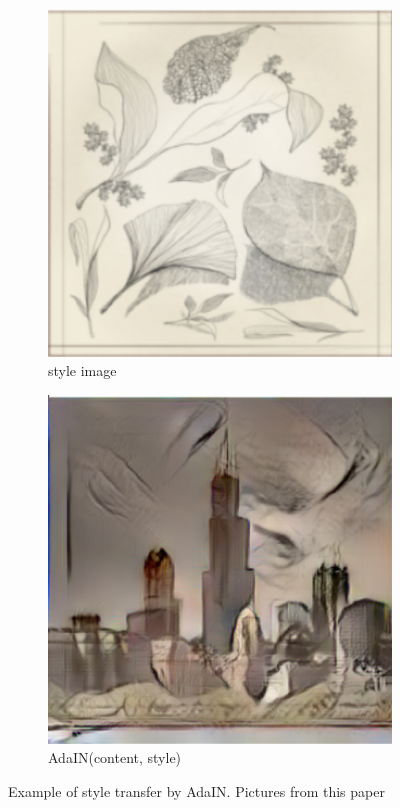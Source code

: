 \documentclass[a4paper]{article}
\begin{document}
\begin{figure}[H]
\begin{subfigure}{.45\textwidth}
    \includegraphics[width=\linewidth]{imagesfrompapers/style image.png}
    \caption{style image}
  \end{subfigure}
  \begin{subfigure}{.45\textwidth}
    \centering
    \includegraphics[width=\linewidth]{imagesfrompapers/AdaIN.png}
    \caption{AdaIN(content, style)}
  \end{subfigure}
  \caption{Example of style transfer by AdaIN. Pictures from this paper \cite{chandran2022adaptive} }
  \label{2figs}
\end{figure}




\end{document}
